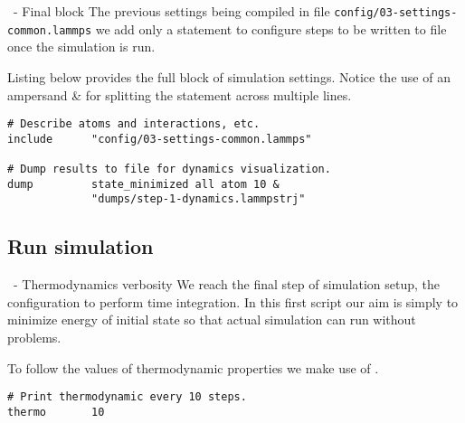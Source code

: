 \begin{frame}[fragile]{\secname}{\subsecname\ - Final block}
The previous settings being compiled in file \Verb|config/03-settings-common.lammps| we add only a  statement to configure steps to be written to file once the simulation is run.

\vspace{0.5cm}
Listing below provides the full block of simulation settings. Notice the use of an ampersand \& for splitting the  statement across multiple lines.
\vspace{0.5cm}

\begin{lstlisting}[language=LAMMPS,basicstyle=\tiny]
# Describe atoms and interactions, etc.
include      "config/03-settings-common.lammps"

# Dump results to file for dynamics visualization.
dump         state_minimized all atom 10 &
             "dumps/step-1-dynamics.lammpstrj"
\end{lstlisting}
\end{frame}

\subsection{Run simulation}

\begin{frame}[fragile]{\secname}{\subsecname\ - Thermodynamics verbosity}
We reach the final step of simulation setup, the configuration to perform time integration. In this first script our aim is simply to minimize energy of initial state so that actual simulation can run without problems.

\vspace{0.5cm}

To follow the values of thermodynamic properties we make use of .

\vspace{0.5cm}

\begin{lstlisting}[language=LAMMPS]
# Print thermodynamic every 10 steps.
thermo       10
\end{lstlisting}
\end{frame}

